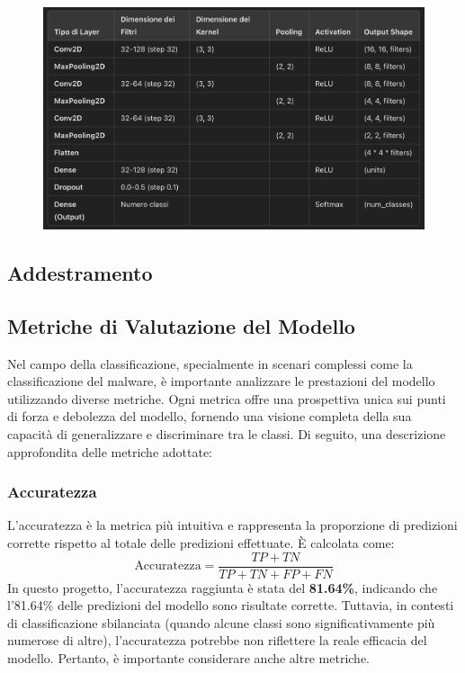\begin{figure}[ht]
    \centering
        \centering
        \includegraphics[width=0.8\linewidth]{images/cnn_architecture.png}
        \label{fig:cnn_architecture}
\end{figure}

\subsection{Addestramento}

\subsection{Metriche di Valutazione del Modello}

Nel campo della classificazione, specialmente in scenari complessi come la classificazione del malware, è importante analizzare le prestazioni del modello utilizzando diverse metriche. Ogni metrica offre una prospettiva unica sui punti di forza e debolezza del modello, fornendo una visione completa della sua capacità di generalizzare e discriminare tra le classi. Di seguito, una descrizione approfondita delle metriche adottate:

\subsubsection{Accuratezza}
L'accuratezza è la metrica più intuitiva e rappresenta la proporzione di predizioni corrette rispetto al totale delle predizioni effettuate. È calcolata come:
\[
\text{Accuratezza} = \frac{TP + TN}{TP + TN + FP + FN}
\]
In questo progetto, l'accuratezza raggiunta è stata del \textbf{81.64\%}, indicando che l'81.64\% delle predizioni del modello sono risultate corrette. Tuttavia, in contesti di classificazione sbilanciata (quando alcune classi sono significativamente più numerose di altre), l'accuratezza potrebbe non riflettere la reale efficacia del modello. Pertanto, è importante considerare anche altre metriche.

